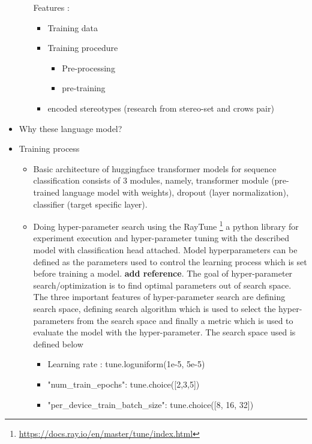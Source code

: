 \begin{itemize}
\begin{itemize}
            Features :
            \begin{itemize}
                \item Training data 
                \item Training procedure
                \begin{itemize}
                    \item Pre-processing
                    \item pre-training
                \end{itemize}
                \item encoded stereotypes (research from stereo-set and crows pair)
            \end{itemize}
    \end{itemize}
    \item Why these language model?
    \item Training process
        \begin{itemize}
            \item Basic architecture of huggingface transformer models for sequence classification consists of 3 modules, namely, transformer module (pre-trained language model with weights), dropout (layer normalization), classifier (target specific layer). 
            \item  Doing hyper-parameter search using the RayTune \footnote{\url{https://docs.ray.io/en/master/tune/index.html}} a python library for experiment execution and hyper-parameter tuning with the described model with classification head attached. Model hyperparameters can be defined as the parameters used to control the learning process which is set before training a model. \cite{bergstra2012random}\textbf{add reference}.  The goal of hyper-parameter search/optimization is to find optimal parameters out of search space. The three important features of hyper-parameter search are defining search space, defining search algorithm which is used to select the hyper-parameters from the search space and finally a metric which is used to evaluate the model with the hyper-parameter. The search space used is defined below 
            \begin{itemize}
                \item Learning rate : tune.loguniform(1e-5, 5e-5)
                \item "num\_train\_epochs": tune.choice([2,3,5])
                \item "per\_device\_train\_batch\_size": tune.choice([8, 16, 32])
            \end{itemize}

\end{itemize}
\end{itemize}
